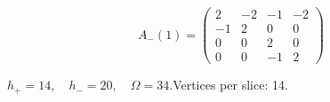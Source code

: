 \begin{minipage}{\linewidth}
\begin{minipage}[c]{0.495\linewidth}
\end{minipage}%
\begin{minipage}[c]{0.495\linewidth}\centering\fontsize{9.7}{12}\selectfont
\setlength{\abovedisplayskip}{4pt}\setlength{\belowdisplayskip}{4pt}
\setlength{\abovedisplayshortskip}{4pt}\setlength{\belowdisplayshortskip}{4pt}
\setlength{\arraycolsep}{3pt}\renewcommand{\arraystretch}{1.08}
\[A_{-}(1)=\begin{pmatrix}2 & -2 & -1 & -2\\-1 & 2 & 0 & 0\\0 & 0 & 2 & 0\\0 & 0 & -1 & 2\end{pmatrix}\]
\end{minipage}%
\par\smallskip\noindent\small $h_+=14,\quad h_-=20,\quad \Omega=34.$\quad Vertices per slice: 14.
\end{minipage}\par\vfill
